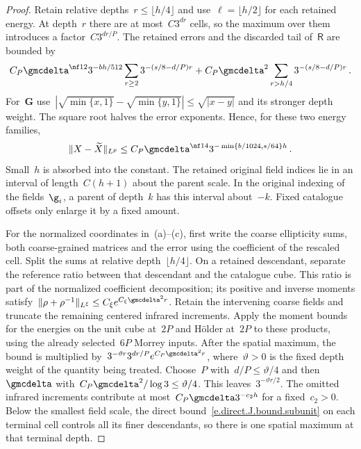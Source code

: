 \documentclass[11pt]{amsart}
\begin{document}
\begin{proof}
\smallskip

Retain relative depths~$r\leq\lfloor h/4\rfloor$ and use~$\ell=\lfloor h/2\rfloor$ for each retained energy. At depth~$r$ there are at most~$C3^{dr}$ cells, so the maximum over them introduces a factor~$C3^{dr/P}$. The retained errors and the discarded tail of~$\mathsf R$ are bounded by
\begin{equation*}
	C_P\gmcdelta^{\nf12}3^{-bh/512}
	\sum_{r\geq2}3^{-(s/8-d/P)r}
	+C_P\gmcdelta^2
	\sum_{r>h/4}3^{-(s/8-d/P)r}\,.
\end{equation*}
For~$\mathbf G$ use~$|\sqrt{\min\{x,1\}}-\sqrt{\min\{y,1\}}| \leq\sqrt{|x-y|}$ and its stronger depth weight. The square root halves the error exponents. Hence, for these two energy families,
\begin{equation*}
	\|X-\widetilde X\|_{L^p}
	\leq C_P\gmcdelta^{\nf14}3^{-\min\{b/1024,s/64\}h}\,.
\end{equation*}
Small~$h$ is absorbed into the constant. The retained original field indices lie in an interval of length~$C(h+1)$ about the parent scale. In the original indexing of the fields~$\g_i$, a parent of depth~$k$ has this interval about~$-k$. Fixed catalogue offsets only enlarge it by a fixed amount.

\smallskip

For the normalized coordinates in~(a)--(c), first write the coarse ellipticity sums, both coarse-grained matrices and the error using the coefficient of the rescaled cell. Split the sums at relative depth~$\lfloor h/4\rfloor$. On a retained descendant, separate the reference ratio between that descendant and the catalogue cube. This ratio is part of the normalized coefficient decomposition; its positive and inverse moments satisfy~$\|\rho+\rho^{-1}\|_{L^\xi}\leq C_\xi e^{C_\xi\gmcdelta^2r}$. Retain the intervening coarse fields and truncate the remaining centered infrared increments. Apply the moment bounds for the energies on the unit cube at~$2P$ and H\"older at~$2P$ to these products, using the already selected~$6P$ Morrey inputs. After the spatial maximum, the bound is multiplied by~$3^{-\vartheta r}3^{dr/P}e^{C_P\gmcdelta^2r}$, where~$\vartheta>0$ is the fixed depth weight of the quantity being treated. Choose~$P$ with~$d/P\leq \vartheta/4$ and then~$\gmcdelta$ with~$C_P\gmcdelta^2/\log3\leq \vartheta/4$. This leaves~$3^{-\vartheta r/2}$. The omitted infrared increments contribute at most~$C_P\gmcdelta3^{-c_2h}$ for a fixed~$c_2>0$. Below the smallest field scale, the direct bound~\eqref{e.direct.J.bound.subunit} on each terminal cell controls all its finer descendants, so there is one spatial maximum at that terminal depth.


\end{proof}
\end{document}
